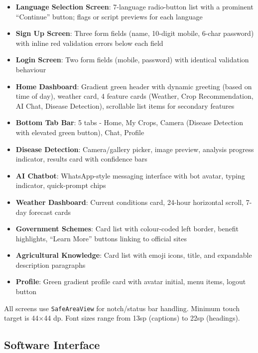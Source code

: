 \documentclass[12pt,a4paper]{article}
\begin{document}
\begin{itemize}
    \item \textbf{Language Selection Screen}: 7-language radio-button list with a prominent ``Continue'' button; flags or script previews for each language
    \item \textbf{Sign Up Screen}: Three form fields (name, 10-digit mobile, 6-char password) with inline red validation errors below each field
    \item \textbf{Login Screen}: Two form fields (mobile, password) with identical validation behaviour
    \item \textbf{Home Dashboard}: Gradient green header with dynamic greeting (based on time of day), weather card, 4 feature cards (Weather, Crop Recommendation, AI Chat, Disease Detection), scrollable list items for secondary features
    \item \textbf{Bottom Tab Bar}: 5 tabs - Home, My Crops, Camera (Disease Detection with elevated green button), Chat, Profile
    \item \textbf{Disease Detection}: Camera/gallery picker, image preview, analysis progress indicator, results card with confidence bars
    \item \textbf{AI Chatbot}: WhatsApp-style messaging interface with bot avatar, typing indicator, quick-prompt chips
    \item \textbf{Weather Dashboard}: Current conditions card, 24-hour horizontal scroll, 7-day forecast cards
    \item \textbf{Government Schemes}: Card list with colour-coded left border, benefit highlights, ``Learn More'' buttons linking to official sites
    \item \textbf{Agricultural Knowledge}: Card list with emoji icons, title, and expandable description paragraphs
    \item \textbf{Profile}: Green gradient profile card with avatar initial, menu items, logout button
\end{itemize}

All screens use \texttt{SafeAreaView} for notch/status bar handling. Minimum touch target is 44$\times$44 dp. Font sizes range from 13sp (captions) to 22sp (headings).

\subsection{Software Interface}
\end{document}
